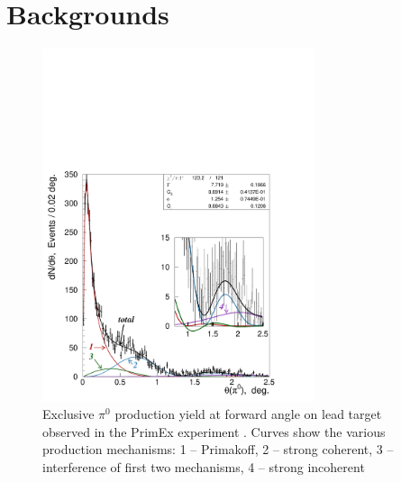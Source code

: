 
\section{Backgrounds}

\begin{figure}[tbp]
\begin{center}
\includegraphics[width=8cm,angle=0,trim={1.5cm 0.5cm 3.5cm 9.5cm},clip]{figures/dndt_pb_partial.pdf}
\end{center}
\caption{Exclusive $\pi^0$ production yield at forward angle on lead target
  observed in the PrimEx experiment \cite{Larin:2010kq}. Curves show the various
  production mechanisms:
1 -- Primakoff, 2 -- strong coherent, 3 -- interference of first two mechanisms, 4 -- strong incoherent}
\label{fig:leaddndt}
\end{figure}


